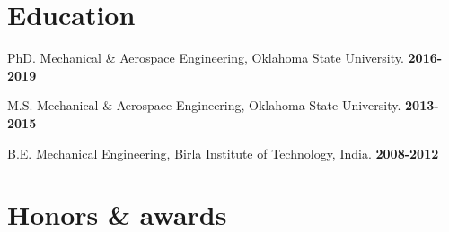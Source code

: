 \documentclass[letterpaper]{article}
\renewenvironment{itemize}{
  \begin{list}{}{
    \setlength{\leftmargin}{1.5em}
  }
}{
  \end{list}
}
\begin{document}
\section*{Education}

\begin{itemize}
  \item PhD. Mechanical \& Aerospace Engineering, Oklahoma State University. \hfill \textbf{2016-2019}
  \item M.S. Mechanical \& Aerospace Engineering, Oklahoma State University. \hfill \textbf{2013-2015}
  \item B.E. Mechanical Engineering, Birla Institute of Technology, India. \hfill \textbf{2008-2012}
\end{itemize}


\section*{Honors \& awards}
\end{document}
